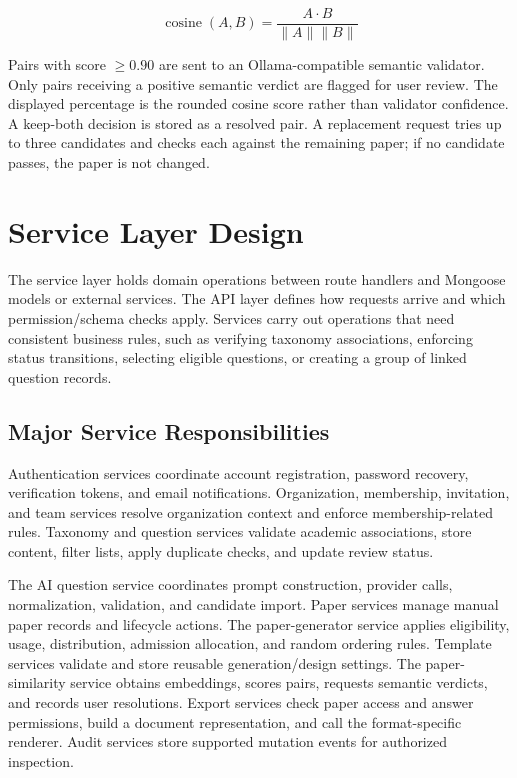 \[
\operatorname{cosine}(A,B)
=
\frac{A \cdot B}{\|A\|\|B\|}
\]

Pairs with score \( \geq 0.90 \) are sent to an Ollama-compatible semantic validator. Only pairs receiving a positive semantic verdict are flagged for user review. The displayed percentage is the rounded cosine score rather than validator confidence. A keep-both decision is stored as a resolved pair. A replacement request tries up to three candidates and checks each against the remaining paper; if no candidate passes, the paper is not changed.

\section{Service Layer Design}

The service layer holds domain operations between route handlers and Mongoose models or external services. The API layer defines how requests arrive and which permission/schema checks apply. Services carry out operations that need consistent business rules, such as verifying taxonomy associations, enforcing status transitions, selecting eligible questions, or creating a group of linked question records.

\subsection{Major Service Responsibilities}

Authentication services coordinate account registration, password recovery, verification tokens, and email notifications. Organization, membership, invitation, and team services resolve organization context and enforce membership-related rules. Taxonomy and question services validate academic associations, store content, filter lists, apply duplicate checks, and update review status.

The AI question service coordinates prompt construction, provider calls, normalization, validation, and candidate import. Paper services manage manual paper records and lifecycle actions. The paper-generator service applies eligibility, usage, distribution, admission allocation, and random ordering rules. Template services validate and store reusable generation/design settings. The paper-similarity service obtains embeddings, scores pairs, requests semantic verdicts, and records user resolutions. Export services check paper access and answer permissions, build a document representation, and call the format-specific renderer. Audit services store supported mutation events for authorized inspection.




